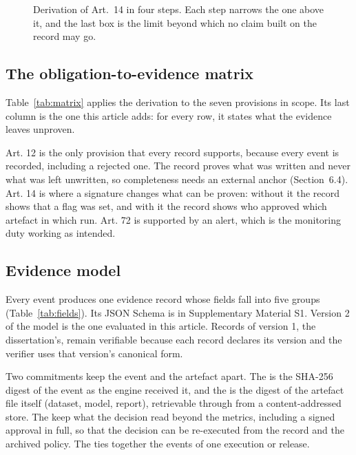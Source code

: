 \begin{figure}[t]
\centering

\caption{Derivation of Art.~14 in four steps. Each step narrows the one above it, and the last box is the limit beyond which no claim built on the record may go.}
\label{fig:derivation}
\end{figure}

\subsection{The obligation-to-evidence matrix}

Table~\ref{tab:matrix} applies the derivation to the seven provisions in scope. Its last column is the one this article adds: for every row, it states what the evidence leaves unproven.



Art. 12 is the only provision that every record supports, because every event is recorded, including a rejected one. The record proves what was written and never what was left unwritten, so completeness needs an external anchor (Section~6.4). Art. 14 is where a signature changes what can be proven: without it the record shows that a flag was set, and with it the record shows who approved which artefact in which run. Art. 72 is supported by an alert, which is the monitoring duty working as intended.

\subsection{Evidence model}

Every event produces one evidence record whose fields fall into five groups (Table~\ref{tab:fields}). Its JSON Schema is in Supplementary Material S1. Version 2 of the model is the one evaluated in this article. Records of version 1, the dissertation's, remain verifiable because each record declares its version and the verifier uses that version's canonical form.



Two commitments keep the event and the artefact apart. The  is the SHA-256 digest of the event as the engine received it, and the  is the digest of the artefact file itself (dataset, model, report), retrievable through  from a content-addressed store. The  keep what the decision read beyond the metrics, including a signed approval in full, so that the decision can be re-executed from the record and the archived policy. The  ties together the events of one execution or release.

